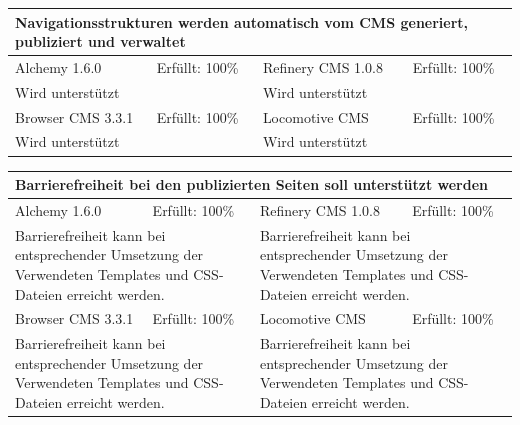 \newline
\newline
\newline
\begin{tabular}[!ht]{|l|l|l|l|}
\hline
\multicolumn{4}{|p{15cm}|}{\textbf{Navigationsstrukturen werden automatisch vom CMS generiert, publiziert und verwaltet}} \\
\hline
  Alchemy 1.6.0 & \cellcolor{green}Erfüllt: 100\% & Refinery CMS 1.0.8 & \cellcolor{green}Erfüllt: 100\% \\
  \hline
  \multicolumn{2}{|p{7.5cm}|}{Wird unterstützt} & \multicolumn{2}{p{7.5cm}|}{Wird unterstützt} \\
  \hline
  Browser CMS 3.3.1 & \cellcolor{green}Erfüllt: 100\% & Locomotive CMS & \cellcolor{green}Erfüllt: 100\% \\
  \hline
  \multicolumn{2}{|p{7.5cm}|}{Wird unterstützt} & \multicolumn{2}{p{7.5cm}|}{Wird unterstützt} \\
\hline
\end{tabular}
\newline
\newline
\newline
\begin{tabular}[!ht]{|l|l|l|l|}
\hline
\multicolumn{4}{|p{15cm}|}{\textbf{Barrierefreiheit bei den publizierten Seiten soll unterstützt werden}} \\
\hline
  Alchemy 1.6.0 & \cellcolor{green}Erfüllt: 100\% & Refinery CMS 1.0.8 & \cellcolor{green}Erfüllt: 100\% \\
  \hline
  \multicolumn{2}{|p{7.5cm}|}{Barrierefreiheit kann bei entsprechender Umsetzung der Verwendeten Templates und CSS-Dateien erreicht werden.} & \multicolumn{2}{p{7.5cm}|}{Barrierefreiheit kann bei entsprechender Umsetzung der Verwendeten Templates und CSS-Dateien erreicht werden.} \\
  \hline
  Browser CMS 3.3.1 & \cellcolor{green}Erfüllt: 100\% & Locomotive CMS & \cellcolor{green}Erfüllt: 100\% \\
  \hline
  \multicolumn{2}{|p{7.5cm}|}{Barrierefreiheit kann bei entsprechender Umsetzung der Verwendeten Templates und CSS-Dateien erreicht werden.} & \multicolumn{2}{p{7.5cm}|}{Barrierefreiheit kann bei entsprechender Umsetzung der Verwendeten Templates und CSS-Dateien erreicht werden.} \\
\hline
\end{tabular}
\newline
\newline
\newline
